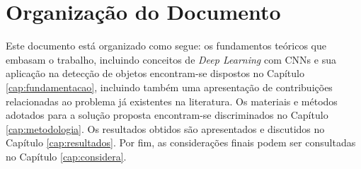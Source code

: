 \section{Organização do Documento}

Este documento está organizado como segue: os fundamentos teóricos que embasam o trabalho, incluindo conceitos de \emph{Deep Learning} com CNNs e sua aplicação na detecção de objetos encontram-se dispostos no Capítulo \ref{cap:fundamentacao}, incluindo também uma apresentação de contribuições relacionadas ao problema já existentes na literatura. Os materiais e métodos adotados para a solução proposta encontram-se discriminados no Capítulo \ref{cap:metodologia}. Os resultados obtidos são apresentados e discutidos no Capítulo \ref{cap:resultados}. Por fim, as considerações finais podem ser consultadas no Capítulo \ref{cap:considera}.